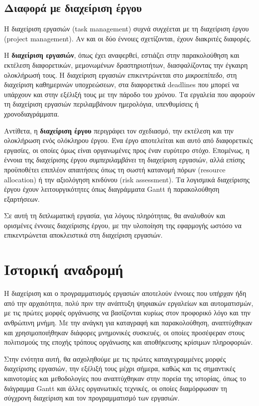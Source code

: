         \subsection{Διαφορά με διαχείριση έργου}
            Η διαχείριση εργασιών (task management) συχνά συγχέεται με τη διαχείριση έργου (project management). Αν και οι δύο έννοιες σχετίζονται, έχουν διακριτές διαφορές.

            Η \textbf{διαχείριση εργασιών}, όπως έχει αναφερθεί, εστιάζει στην παρακολούθηση και εκτέλεση διαφορετικών, μεμονωμένων δραστηριοτήτων, διασφαλίζοντας την έγκαιρη ολοκλήρωσή τους. Η διαχείριση εργασιών επικεντρώνεται στο \textit{μικροεπίπεδο}, στη διαχείριση καθημερινών υποχρεώσεων, στα διαφορετικά deadlines που μπορεί να υπάρχουν και στην εξέλιξή τους με την πάροδο του χρόνου. Τα εργαλεία που αφορούν τη διαχείριση εργασιών περιλαμβάνουν ημερολόγια, υπενθυμίσεις ή χρονοδιαγράμματα.

            Αντίθετα, η \textbf{διαχείριση έργου} περιγράφει τον σχεδιασμό, την εκτέλεση και την ολοκλήρωση ενός ολόκληρου έργου. Ένα έργο αποτελείται και αυτό από διαφορετικές εργασίες, οι οποίες όμως είναι οργανωμένες προς έναν ευρύτερο στόχο. Επομένως, η έννοια της διαχείρισης έργου \textit{συμπεριλαμβάνει} τη διαχείριση εργασιών, αλλά επίσης προϋποθέτει επιπλέον απαιτήσεις όπως τη σωστή κατανομή πόρων (resource allocation) ή την αξιολόγηση κινδύνου (risk assessment). Τα λογισμικά διαχείρισης έργου έχουν λειτουργικότητες όπως διαγράμματα Gantt ή παρακολούθηση εξαρτήσεων.

            Σε αυτή τη διπλωματική εργασία, για λόγους πληρότητας, θα αναλυθούν και ορισμένες έννοιες διαχείρισης έργου, με την υλοποίηση της εφαρμογής ωστόσο να επικεντρώνεται αποκλειστικά στη διαχείριση εργασιών.


    \section{Ιστορική αναδρομή}
        Η διαχείριση και ο προγραμματισμός εργασιών αποτελούν έννοιες που υπήρχαν ήδη από την αρχαιότητα, πολύ πριν την ανάπτυξη ψηφιακών εργαλείων και αυτοματισμών, με τις πρώτες μορφές οργάνωσης να βασίζονται κυρίως στον προφορικό λόγο και την ανθρώπινη μνήμη. Με την ανάγκη για καταγραφή και παρακολούθηση, αναπτύχθηκαν και χρησιμοποιήθηκαν διάφορες μνημονικές συσκευές, οι οποίες προσέφεραν στους πολιτισμούς της εποχής τρόπους οργάνωσης και αποθήκευσης κρίσιμων πληροφοριών.

        Στην ενότητα αυτή, θα ασχοληθούμε με τις πρώτες καταγεγραμμένες μορφές διαχείρισης εργασιών, την εξέλιξή τους μέχρι σήμερα, καθώς και τις σημαντικές καινοτομίες και μεθοδολογίες που αναπτύχθηκαν στην πορεία της ιστορίας, όπως το διάγραμμα Gantt και άλλες οργανωτικές τεχνικές, οι οποίες διαμόρφωσαν τη σύγχρονη διαχείριση και τον προγραμματισμό των εργασιών.

